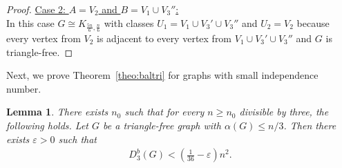 \documentclass[11pt]{article}
\newtheorem{lemma}[theo]{Lemma}
\theoremstyle{definition}
\numberwithin{theo}{section}
\begin{document}
\begin{proof}
\underline{Case 2: $A=V_2$ and $B=V_1\cup V_3''$:}\\
In this case $G\cong K_{\frac{5n}{6},\frac{n}{6}}$ with classes $U_1= V_1 \cup V_3' \cup V_3''$ and $U_2= V_2$ because every vertex from $V_2$ is adjacent to every vertex from $V_1 \cup V_3' \cup V_3''$ and $G$ is triangle-free. \end{proof}
Next, we prove Theorem~\ref{theo:baltri} for graphs with small independence number.
\begin{lemma}
\label{lem:tripsmallind}
There exists $n_0$ such that for every $n\geq n_0$ divisible by three, the following holds. Let $G$ be a triangle-free graph with $\alpha(G)\leq n/3$. Then there exists $\varepsilon>0$ such that
\begin{align*}
    D_3^b(G)< \left(\frac{1}{36}-\varepsilon\right) n^2.
\end{align*}
\end{lemma}
\end{document}
